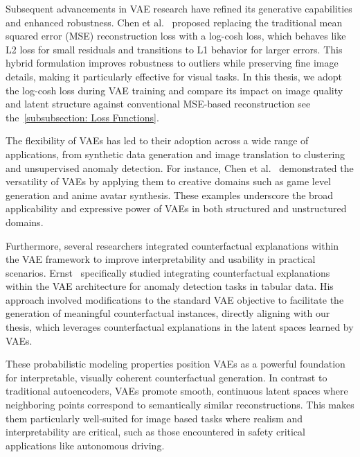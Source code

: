 Subsequent advancements in VAE research have refined its generative capabilities and enhanced robustness. Chen et al.~\cite{chen2019log} proposed replacing the traditional mean squared error (MSE) reconstruction loss with a log-cosh loss, which behaves like L2 loss for small residuals and transitions to L1 behavior for larger errors. This hybrid formulation improves robustness to outliers while preserving fine image details, making it particularly effective for visual tasks. In this thesis, we adopt the log-cosh loss during VAE training and compare its impact on image quality and latent structure against conventional MSE-based reconstruction see the~\cref{subsubsection: Loss Functions}.

The flexibility of VAEs has led to their adoption across a wide range of applications, from synthetic data generation and image translation to clustering and unsupervised anomaly detection. For instance, Chen et al.~\cite{chen2019log} demonstrated the versatility of VAEs by applying them to creative domains such as game level generation and anime avatar synthesis. These examples underscore the broad applicability and expressive power of VAEs in both structured and unstructured domains.

Furthermore, several researchers integrated counterfactual explanations within the VAE framework to improve interpretability and usability in practical scenarios. Ernst~\cite{ernst2024counterfactual} specifically studied integrating counterfactual explanations within the VAE architecture for anomaly detection tasks in tabular data. His approach involved modifications to the standard VAE objective to facilitate the generation of meaningful counterfactual instances, directly aligning with our thesis, which leverages counterfactual explanations in the latent spaces learned by VAEs.

These probabilistic modeling properties position VAEs as a powerful foundation for interpretable, visually coherent counterfactual generation. In contrast to traditional autoencoders, VAEs promote smooth, continuous latent spaces where neighboring points correspond to semantically similar reconstructions. This makes them particularly well-suited for image based tasks where realism and interpretability are critical, such as those encountered in safety critical applications like autonomous driving.

